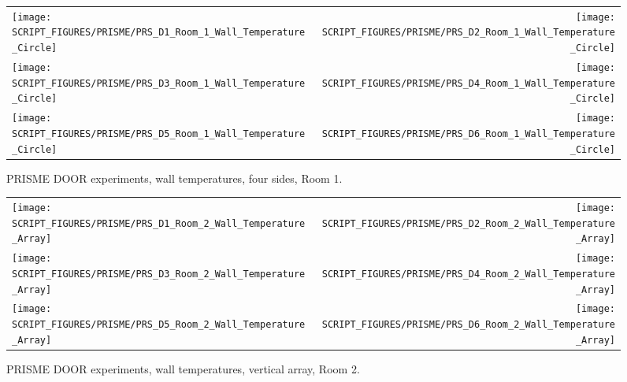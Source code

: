 \newpage

\begin{figure}[p]
\begin{tabular*}{\textwidth}{l@{\extracolsep{\fill}}r}
\texttt{[image: SCRIPT\_FIGURES/PRISME/PRS\_D1\_Room\_1\_Wall\_Temperature\_Circle]} &
\texttt{[image: SCRIPT\_FIGURES/PRISME/PRS\_D2\_Room\_1\_Wall\_Temperature\_Circle]} \\
\texttt{[image: SCRIPT\_FIGURES/PRISME/PRS\_D3\_Room\_1\_Wall\_Temperature\_Circle]} &
\texttt{[image: SCRIPT\_FIGURES/PRISME/PRS\_D4\_Room\_1\_Wall\_Temperature\_Circle]} \\
\texttt{[image: SCRIPT\_FIGURES/PRISME/PRS\_D5\_Room\_1\_Wall\_Temperature\_Circle]} &
\texttt{[image: SCRIPT\_FIGURES/PRISME/PRS\_D6\_Room\_1\_Wall\_Temperature\_Circle]}
\end{tabular*}
\caption[PRISME DOOR experiments, wall temperatures, four sides, Room 1]{PRISME DOOR experiments, wall temperatures, four sides, Room 1.}
\label{PRISME_Wall_Circle_Room_1}
\end{figure}

\begin{figure}[p]
\begin{tabular*}{\textwidth}{l@{\extracolsep{\fill}}r}
\texttt{[image: SCRIPT\_FIGURES/PRISME/PRS\_D1\_Room\_2\_Wall\_Temperature\_Array]} &
\texttt{[image: SCRIPT\_FIGURES/PRISME/PRS\_D2\_Room\_2\_Wall\_Temperature\_Array]} \\
\texttt{[image: SCRIPT\_FIGURES/PRISME/PRS\_D3\_Room\_2\_Wall\_Temperature\_Array]} &
\texttt{[image: SCRIPT\_FIGURES/PRISME/PRS\_D4\_Room\_2\_Wall\_Temperature\_Array]} \\
\texttt{[image: SCRIPT\_FIGURES/PRISME/PRS\_D5\_Room\_2\_Wall\_Temperature\_Array]} &
\texttt{[image: SCRIPT\_FIGURES/PRISME/PRS\_D6\_Room\_2\_Wall\_Temperature\_Array]}
\end{tabular*}
\caption[PRISME DOOR experiments, wall temperatures, vertical array, Room 2]{PRISME DOOR experiments, wall temperatures, vertical array, Room 2.}
\label{PRISME_Wall_Array_Room_2}
\end{figure}

